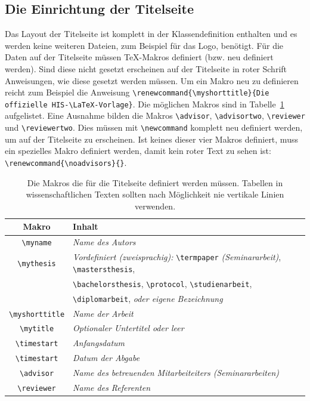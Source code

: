 \documentclass[english,ngerman]{KITreprt}
\renewcommand{\myshorttitle}{}
\begin{document}
\subsection{Die Einrichtung der Titelseite}
Das Layout der Titelseite ist komplett in der Klassendefinition enthalten und es werden keine weiteren Dateien, zum Beispiel f\"ur das Logo, ben\"otigt.
F\"ur die Daten auf der Titelseite m\"ussen \TeX-Makros definiert (bzw. neu definiert werden).
Sind diese nicht gesetzt erscheinen auf der Titelseite in roter Schrift Anweisungen, wie diese gesetzt werden m\"ussen.
Um ein Makro neu zu definieren reicht zum Beispiel die Anweisung \lstinline[language={[LaTeX]TeX}]!\renewcommand{\myshorttitle}{Die offizielle HIS-\LaTeX-Vorlage}!.
Die m\"oglichen Makros sind in Tabelle~\ref{tab:makros} aufgelistet.
Eine Ausnahme bilden die Makros \texttt{\textbackslash  advisor}, \texttt{\textbackslash  advisortwo}, \texttt{\textbackslash  reviewer} und \texttt{\textbackslash  reviewertwo}. 
Dies m\"ussen mit \texttt{\textbackslash  newcommand} komplett neu definiert werden, um auf der Titelseite zu erscheinen.
Ist keines dieser vier Makros definiert, muss ein spezielles Makro definiert werden, damit kein roter Text zu sehen ist:  \lstinline[language={[LaTeX]TeX}]!\renewcommand{\noadvisors}{}!.
\begin{table}[h]
\centering
\begin{tabular}{cl}
\toprule
Makro & Inhalt \\
\midrule 
\texttt{\textbackslash myname} & \emph{Name des Autors} \\
\texttt{\textbackslash mythesis} & \emph{Vordefiniert (zweisprachig):} \texttt{\textbackslash termpaper} \emph{(Seminararbeit)}, \texttt{\textbackslash mastersthesis}, \\
&  \texttt{\textbackslash bachelorsthesis}, \texttt{\textbackslash protocol},  \texttt{\textbackslash studienarbeit}, \\
& \texttt{\textbackslash diplomarbeit}, \emph{oder eigene Bezeichnung} \\
\texttt{\textbackslash myshorttitle} & \emph{Name der Arbeit} \\
\texttt{\textbackslash mytitle} & \emph{Optionaler Untertitel oder leer } \\
\texttt{\textbackslash timestart} & \emph{Anfangsdatum} \\
\texttt{\textbackslash timestart} & \emph{Datum der Abgabe} \\
\texttt{\textbackslash  advisor} & \emph{Name des betreuenden Mitarbeiteiters (Seminararbeiten)} \\
\texttt{\textbackslash  reviewer} & \emph{Name des Referenten} \\
\bottomrule
\end{tabular}
\caption{Die Makros die f\"ur die Titelseite definiert werden m\"ussen. Tabellen in wissenschaftlichen Texten sollten nach M\"oglichkeit nie vertikale Linien verwenden. }
\label{tab:makros}
\end{table}
\end{document}

